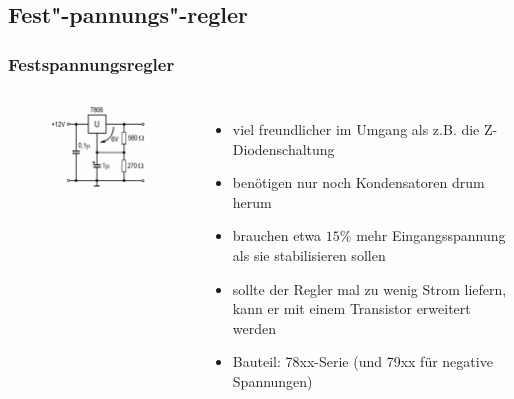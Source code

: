 \subsection*{Fest"-pannungs"-regler}
\begin{frame}
  \frametitle{Festspannungsregler}
  \begin{columns}
    \begin{figure}
      \includegraphics[width=1\textwidth,height=.7\textheight,keepaspectratio]{a17/TD319.png}
    \end{figure}
    \begin{itemize}
      \item viel freundlicher im Umgang als z.B. die Z-Diodenschaltung
      \item benötigen nur noch Kondensatoren drum herum
      \item brauchen etwa $15\%$ mehr Eingangsspannung als sie stabilisieren sollen
      \item sollte der Regler mal zu wenig Strom liefern, kann er mit einem Transistor erweitert werden
      \item Bauteil: 78xx-Serie (und 79xx für negative Spannungen)
    \end{itemize}
  \end{columns}
\end{frame}

